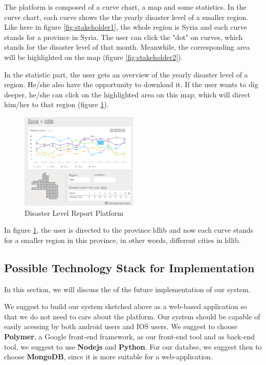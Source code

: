       The platform is composed of a curve chart,
      a map and some statistics.
      In the curve chart,
      each curve shows the the yearly disaster level of a smaller region.
      Like here in figure \ref{fig:stakeholder1}, 
      the whole region is Syria and each curve stands for a province in Syria.
      The user can click the "dot" on curves,
      which stands for the disaster level of that month.
      Meanwhile, the corresponding area will be highlighted on the map (figure \ref{fig:stakeholder2}).

      In the statistic part,
      the user gets an overview of the yearly disaster level of a region.
      He/she also have the opportunity to download it.
      If the user wants to dig deeper, 
      he/she can click on the highlighted area on this map,
      which will direct him/her to that region (figure \ref{fig:stakeholder3}).

      \begin{figure}[H]
      \centering
      \includegraphics[width=0.5\textwidth]{figures/function-stakeholder-3}
      \caption{Disaster Level Report Platform}
      \label{fig:stakeholder3}
      \end{figure}

      In figure \ref{fig:stakeholder3},
      the user is directed to the province ldlib and now each curve stands for a smaller region in this province,
      in other words, different cities in ldlib.
    
    \subsection{Possible Technology Stack for Implementation}
    In this section, we will discuss the of the future implementation of our system. 

    We suggest to build our system sketched above as a web-based application so that we do not need to care about the platform.
    Our system should be capable of easily acessing by both android users and IOS users. 
    We suggest to choose \textbf{Polymer}, a Google front-end framework, 
    as our front-end tool and as back-end tool, we suggest to use \textbf{Nodejs} and \textbf{Python}. 
    For our databse, we suggest then to choose \textbf{MongoDB}, since it is more suitable for a web-application.